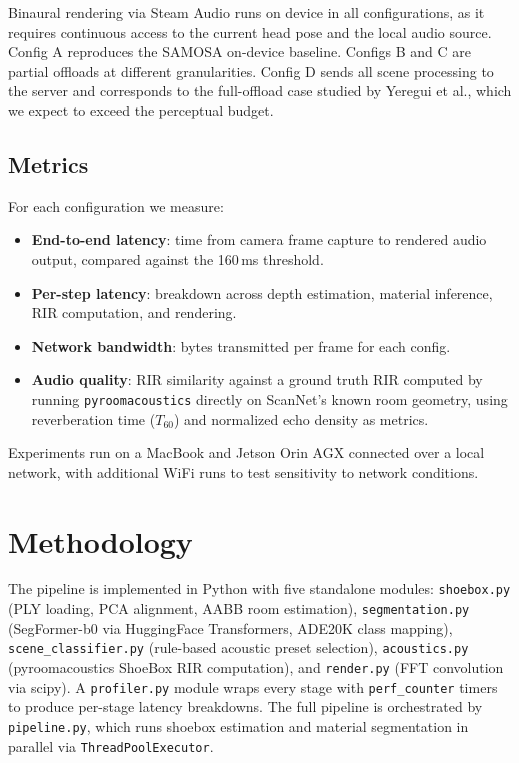 \documentclass[11pt]{article}
\begin{document}
Binaural rendering via Steam Audio runs on device in all configurations, as
it requires continuous access to the current head pose and the local audio
source. Config A reproduces the SAMOSA on-device baseline. Configs B and C
are partial offloads at different granularities. Config D sends all scene
processing to the server and corresponds to the full-offload case studied
by Yeregui et al., which we expect to exceed the perceptual budget.

\subsection{Metrics}

For each configuration we measure:

\begin{itemize}[noitemsep]
  \item \textbf{End-to-end latency}: time from camera frame capture to
        rendered audio output, compared against the 160\,ms threshold.
  \item \textbf{Per-step latency}: breakdown across depth estimation,
        material inference, RIR computation, and rendering.
  \item \textbf{Network bandwidth}: bytes transmitted per frame for each config.
  \item \textbf{Audio quality}: RIR similarity against a ground truth RIR
        computed by running \texttt{pyroomacoustics} directly on ScanNet's
        known room geometry, using reverberation time ($T_{60}$) and
        normalized echo density as metrics.
\end{itemize}

Experiments run on a MacBook and Jetson Orin AGX connected over a local
network, with additional WiFi runs to test sensitivity to network conditions.

\section{Methodology}

The pipeline is implemented in Python with five standalone modules:
\texttt{shoebox.py} (PLY loading, PCA alignment, AABB room estimation),
\texttt{segmentation.py} (SegFormer-b0 via HuggingFace Transformers, ADE20K class mapping),
\texttt{scene\_classifier.py} (rule-based acoustic preset selection),
\texttt{acoustics.py} (pyroomacoustics ShoeBox RIR computation), and
\texttt{render.py} (FFT convolution via scipy). A \texttt{profiler.py} module
wraps every stage with \texttt{perf\_counter} timers to produce per-stage latency
breakdowns. The full pipeline is orchestrated by \texttt{pipeline.py}, which runs
shoebox estimation and material segmentation in parallel via \texttt{ThreadPoolExecutor}.
\end{document}
